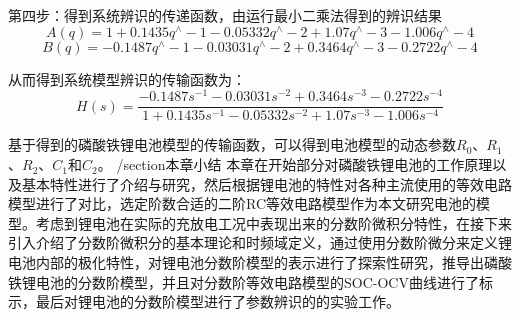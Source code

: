 第四步：得到系统辨识的传递函数，由运行最小二乘法得到的辨识结果
\begin{equation}
A\left( q \right)=1+0.1435{{q}^{\wedge }}-1-0.05332{{q}^{\wedge }}-2+1.07{{q}^{\wedge }}-3-1.006{{q}^{\wedge }}-4
\end{equation}
\begin{equation}
B\left( q \right)=-0.1487{{q}^{\wedge }}-1-0.03031{{q}^{\wedge }}-2+0.3464{{q}^{\wedge }}-3-0.2722{{q}^{\wedge }}-4
\end{equation}

从而得到系统模型辨识的传输函数为：
\begin{equation}
H\left( s \right)=\frac{-0.1487{{s}^{-1}}-0.03031{{s}^{-2}}+0.3464{{s}^{-3}}-0.2722{{s}^{-4}}}{1+0.1435{{s}^{-1}}-0.05332{{s}^{-2}}+1.07{{s}^{-3}}-1.006{{s}^{-4}}}
\end{equation}	
	  
	基于得到的磷酸铁锂电池模型的传输函数，可以得到电池模型的动态参数${{R}_{0}}$、${{R}_{1}}$、${{R}_{2}}$、${{C}_{1}}$和${{C}_{2}}$。
/section{本章小结}
本章在开始部分对磷酸铁锂电池的工作原理以及基本特性进行了介绍与研究，然后根据锂电池的特性对各种主流使用的等效电路模型进行了对比，选定阶数合适的二阶RC等效电路模型作为本文研究电池的模型。考虑到锂电池在实际的充放电工况中表现出来的分数阶微积分特性，在接下来引入介绍了分数阶微积分的基本理论和时频域定义，通过使用分数阶微分来定义锂电池内部的极化特性，对锂电池分数阶模型的表示进行了探索性研究，推导出磷酸铁锂电池的分数阶模型，并且对分数阶等效电路模型的SOC-OCV曲线进行了标示，最后对锂电池的分数阶模型进行了参数辨识的的实验工作。

